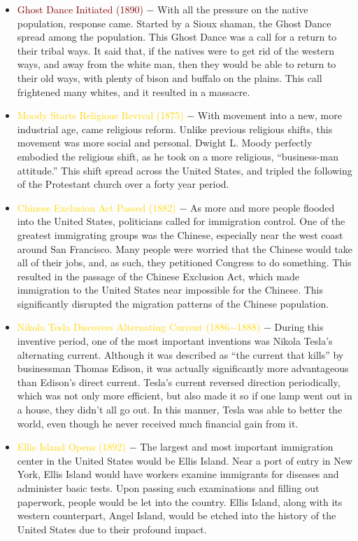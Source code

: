 \documentclass[12pt]{article}
\begin{document}
\begin{itemize}
  \item \textcolor{maroon}{Ghost Dance Initiated (1890)} $-$ With all the pressure on the native population, response came. Started by a Sioux shaman, the Ghost Dance spread among the population. This Ghost Dance was a call for a return to their tribal ways. It said that, if the natives were to get rid of the western ways, and away from the white man, then they would be able to return to their old ways, with plenty of bison and buffalo on the plains. This call frightened many whites, and it resulted in a massacre.

  \item \textcolor{gold}{Moody Starts Religious Revival (1875)} $-$ With movement into a new, more industrial age, came religious reform. Unlike previous religious shifts, this movement was more social and personal. Dwight L. Moody perfectly embodied the religious shift, as he took on a more religious, ``business-man attitude.'' This shift spread across the United States, and tripled the following of the Protestant church over a forty year period.

  \item \textcolor{gold}{Chinese Exclusion Act Passed (1882)} $-$ As more and more people flooded into the United States, politicians called for immigration control. One of the greatest immigrating groups was the Chinese, especially near the west coast around San Francisco. Many people were worried that the Chinese would take all of their jobs, and, as such, they petitioned Congress to do something. This resulted in the passage of the Chinese Exclusion Act, which made immigration to the United States near impossible for the Chinese. This significantly disrupted the migration patterns of the Chinese population.

  \item \textcolor{gold}{Nikola Tesla Discovers Alternating Current (1886$-$1888)} $-$ During this inventive period, one of the most important inventions was Nikola Tesla's alternating current. Although it was described as ``the current that kills'' by businessman Thomas Edison, it was actually significantly more advantageous than Edison's direct current. Tesla's current reversed direction periodically, which was not only more efficient, but also made it so if one lamp went out in a house, they didn't all go out. In this manner, Tesla was able to better the world, even though he never received much financial gain from it.

  \item \textcolor{gold}{Ellis Island Opens (1892)} $-$ The largest and most important immigration center in the United States would be Ellis Island. Near a port of entry in New York, Ellis Island would have workers examine immigrants for diseases and administer basic tests. Upon passing such examinations and filling out paperwork, people would be let into the country. Ellis Island, along with its western counterpart, Angel Island, would be etched into the history of the United States due to their profound impact.


\end{itemize}
\end{document}
